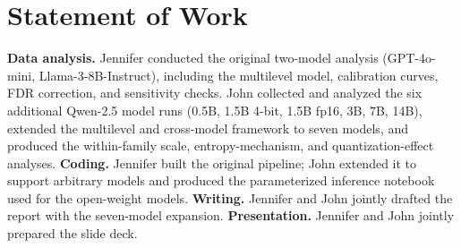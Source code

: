 \documentclass[11pt]{article}
\begin{document}
\section*{Statement of Work}

\textbf{Data analysis.} Jennifer conducted the original two-model
analysis (GPT-4o-mini, Llama-3-8B-Instruct), including the multilevel model,
calibration curves, FDR correction, and sensitivity checks. John
collected and analyzed the six additional Qwen-2.5 model runs (0.5B, 1.5B 4-bit, 1.5B fp16, 3B, 7B, 14B), extended the multilevel and cross-model framework
to seven models, and produced the within-family scale, entropy-mechanism, and
quantization-effect analyses.
\textbf{Coding.} Jennifer built the original pipeline; John
extended it to support arbitrary models and produced the parameterized
inference notebook used for the open-weight models.
\textbf{Writing.} Jennifer and John jointly drafted the report with the seven-model expansion.
\textbf{Presentation.} Jennifer and John jointly prepared the slide deck.



\end{document}

